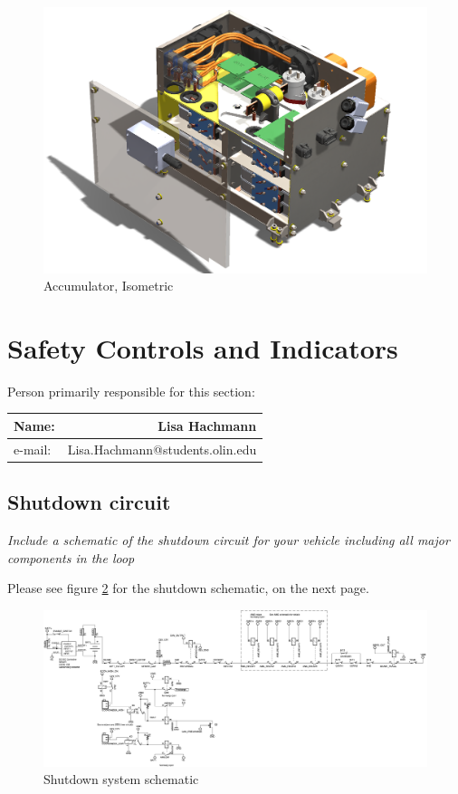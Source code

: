 \documentclass{article}
\begin{document}
\begin{figure}[H]
    \centering
    \includegraphics[width = 0.7 \textwidth]{accumulator_isoview}
    \caption{Accumulator, Isometric}
    \label{acc_iso}
\end{figure}

\section{Safety Controls and Indicators}

Person primarily responsible for this section:
    \begin{table}[H]
        \centering
        \label{responsible6}
        \begin{tabular}{lr}
        Name: & Lisa Hachmann \\ \hline
        e-mail: & Lisa.Hachmann@students.olin.edu \\ \hline
        \end{tabular}
    \end{table}

\subsection{Shutdown circuit}

\textit{Include a schematic of the shutdown circuit for your vehicle including all major components in the loop}

Please see figure \ref{shutdownschem} for the shutdown schematic, on the next page.

        \begin{figure}
            \includegraphics[width=\textheight]{shutdownsystem}
            \caption{Shutdown system schematic}
            \label{shutdownschem}
        \end{figure}
\end{document}
